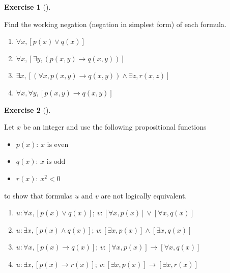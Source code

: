\documentclass[
  letterpaper,
  10pt,
  reqno,
  twopage,
  openany]{book}
\providecommand{\tightlist}{%
  \setlength{\itemsep}{0pt}\setlength{\parskip}{0pt}}\usepackage{longtable,booktabs,array}
\theoremstyle{plain}
\theoremstyle{definition}
\newtheorem{exercise}{Exercise}[chapter]
\theoremstyle{definition}
\theoremstyle{definition}
\theoremstyle{plain}
\theoremstyle{plain}
\theoremstyle{remark}
\begin{document}
\leavevmode{}%
\begin{exercise}[]\label{exr-working-negation}

Find the working negation (negation in simplest form) of each formula.

\begin{enumerate}
\def\labelenumi{\arabic{enumi}.}
\tightlist
\item
  \(\forall x, [p(x)\lor q(x)]\)
\item
  \(\forall x, [\exists y, (p(x,y)\rightarrow q(x,y))]\)
\item
  \(\exists x, [(\forall x, p(x,y)\rightarrow q(x,y))\land \exists z, r(x,z)]\)
\item
  \(\forall x, \forall y, [p(x,y)\rightarrow q(x,y)]\)
\end{enumerate}

\end{exercise}

\leavevmode{}%
\begin{exercise}[]\label{exr-show-logically-equivalent}

Let \(x\) be an integer and use the following propositional functions

\begin{itemize}
\tightlist
\item
  \(p(x)\): \(x \text{ is even }\)
\item
  \(q(x)\): \(x \text{ is odd }\)
\item
  \(r(x)\): \(x^2<0\)
\end{itemize}

to show that formulas \(u\) and \(v\) are not logically equivalent.

\begin{enumerate}
\def\labelenumi{\arabic{enumi}.}
\tightlist
\item
  \(u: \forall x, [p(x)\lor q(x)]\);
  \quad \(v: [\forall x, p(x)] \lor [\forall x, q(x)]\)
\item
  \(u: \exists x, [p(x)\land q(x)]\);
  \quad \(v: [\exists x, p(x)] \land [\exists x, q(x)]\)
\item
  \(u: \forall x, [p(x)\rightarrow q(x)]\);
  \quad \(v: [\forall x, p(x)] \rightarrow [\forall x, q(x)]\)
\item
  \(u: \exists x, [p(x)\rightarrow r(x)]\);
  \quad \(v: [\exists x, p(x)] \rightarrow [\exists x, r(x)]\)
\end{enumerate}

\end{exercise}
\end{document}
